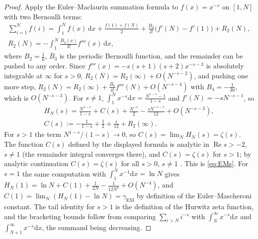 \documentclass[11pt,reqno]{amsart}
\theoremstyle{plain}
\theoremstyle{definition}
\theoremstyle{remark}
\numberwithin{equation}{section}
\newcommand{\dd}{\mathrm{d}}
\begin{document}
\begin{proof}
Apply the Euler--Maclaurin summation formula \cite{Apostol1999} to $f(x)=x^{-s}$ on $[1,N]$ with two Bernoulli terms:
\begin{gather*}
\sum_{i=1}^N f(i)=\int_1^N f(x)\,\dd x+\frac{f(1)+f(N)}2+\frac{B_2}{2!}\bigl(f'(N)-f'(1)\bigr)+R_2(N),\\
R_2(N)=-\int_1^N\frac{\overline B_3(x)}{3!}f'''(x)\,\dd x,
\end{gather*}
where $B_2=\frac16$, $\overline B_3$ is the periodic Bernoulli function, and the remainder can be pushed to any order. Since $f'''(x)=-s(s+1)(s+2)x^{-s-3}$ is absolutely integrable at $\infty$ for $s>0$, $R_2(N)=R_2(\infty)+O(N^{-s-2})$, and pushing one more step, $R_2(N)=R_2(\infty)+\frac{B_4}{4!}f'''(N)+O(N^{-s-4})$ with $B_4=-\frac1{30}$, which is $O(N^{-s-3})$. For $s\ne1$, $\int_1^Nx^{-s}\dd x=\frac{N^{1-s}-1}{1-s}$ and $f'(N)=-sN^{-s-1}$, so
\begin{gather*}
H_N(s)=\frac{N^{1-s}}{1-s}+C(s)+\frac{N^{-s}}2-\frac{s N^{-s-1}}{12}+O(N^{-s-3}),\\
C(s):=-\frac1{1-s}+\frac12+\frac s{12}+R_2(\infty).
\end{gather*}
For $s>1$ the term $N^{1-s}/(1-s)\to0$, so $C(s)=\lim_NH_N(s)=\zeta(s)$. The function $C(s)$ defined by the displayed formula is analytic in $\operatorname{Re}s>-2$, $s\ne1$ (the remainder integral converges there), and $C(s)=\zeta(s)$ for $s>1$; by analytic continuation $C(s)=\zeta(s)$ for all $s>0$, $s\ne1$ \cite[\S2.1, eq.~(2.1.4)]{Titchmarsh1986}. This is \eqref{eq:EMs}. For $s=1$ the same computation with $\int_1^Nx^{-1}\dd x=\ln N$ gives $H_N(1)=\ln N+C(1)+\frac1{2N}-\frac1{12N^2}+O(N^{-4})$, and $C(1)=\lim_N(H_N(1)-\ln N)=\gamma_{\mathrm{EM}}$ by definition of the Euler--Mascheroni constant. The tail identity for $s>1$ is the definition of the Hurwitz zeta function, and the bracketing bounds follow from comparing $\sum_{i>N}i^{-s}$ with $\int_N^\infty x^{-s}\dd x$ and $\int_{N+1}^\infty x^{-s}\dd x$, the summand being decreasing.
\end{proof}
\end{document}
